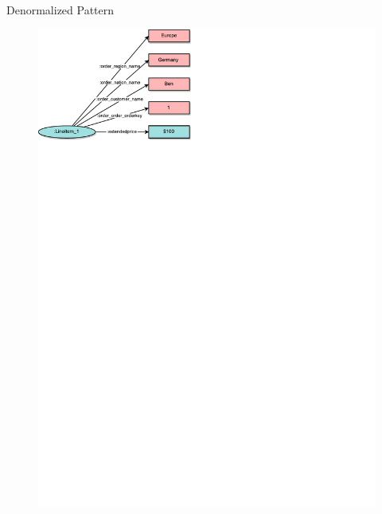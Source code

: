 \begin{frame}{\patsec}{Denormalized Pattern}
    \begin{figure}
        \includegraphics[trim=0 648 255 0,clip,width=1\textwidth]{images/denormalizedpattern.pdf}
    \end{figure}
\end{frame}

